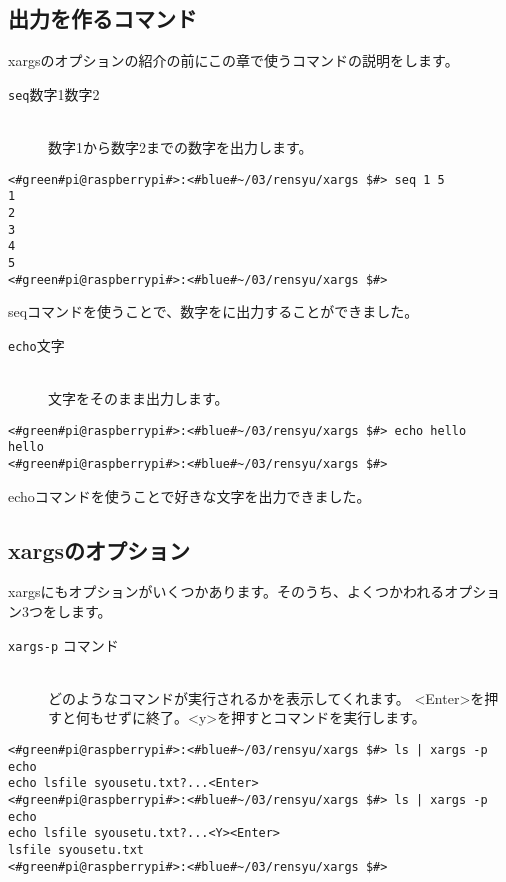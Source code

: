 \subsection{出力を作るコマンド}
xargsのオプションの紹介の前にこの章で使うコマンドの説明をします。
\begin{description}
    \item[\texttt{seq}\textvisiblespace 数字1\textvisiblespace 数字2]\mbox{}\\
    数字1から数字2までの数字を出力します。
\end{description}

\begin{lstlisting}[caption=seqコマンド]
<#green#pi@raspberrypi#>:<#blue#~/03/rensyu/xargs $#> seq 1 5
1
2
3
4
5
<#green#pi@raspberrypi#>:<#blue#~/03/rensyu/xargs $#>
\end{lstlisting}
seqコマンドを使うことで、数字をに出力することができました。

\begin{description}
    \item[\texttt{echo}\textvisiblespace 文字]\mbox{}\\
    文字をそのまま出力します。
\end{description}

\begin{lstlisting}[caption=seqコマンド]
<#green#pi@raspberrypi#>:<#blue#~/03/rensyu/xargs $#> echo hello
hello
<#green#pi@raspberrypi#>:<#blue#~/03/rensyu/xargs $#>
\end{lstlisting}
echoコマンドを使うことで好きな文字を出力できました。

\subsection{xargsのオプション}
xargsにもオプションがいくつかあります。そのうち、よくつかわれるオプション3つをします。

\begin{description}
    \item[\texttt{xargs}\textvisiblespace \texttt{-p}\textvisiblespace
                コマンド]\mbox{}\\
    どのようなコマンドが実行されるかを表示してくれます。
    <Enter>を押すと何もせずに終了。<y>を押すとコマンドを実行します。
\end{description}

\begin{lstlisting}[caption=xargsコマンドのオプションp]
<#green#pi@raspberrypi#>:<#blue#~/03/rensyu/xargs $#> ls | xargs -p echo
echo lsfile syousetu.txt?...<Enter>
<#green#pi@raspberrypi#>:<#blue#~/03/rensyu/xargs $#> ls | xargs -p echo
echo lsfile syousetu.txt?...<Y><Enter>
lsfile syousetu.txt
<#green#pi@raspberrypi#>:<#blue#~/03/rensyu/xargs $#>
\end{lstlisting}

